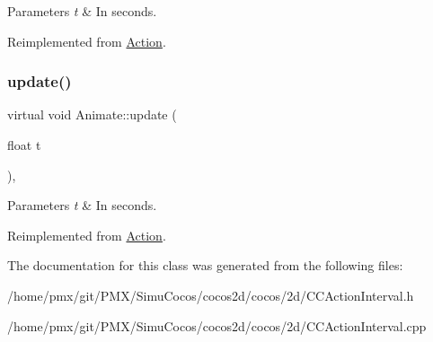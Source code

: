 \begin{DoxyParams}{Parameters}
{\em t} & In seconds. \\
\hline
\end{DoxyParams}


Reimplemented from \hyperlink{classAction_a937e646e63915e33ad05ba149bfcf239}{Action}.

\mbox{\label{classAnimate_a643f933a12b158eb94d1aaa2d8eff13f}} 
\subsubsection{\texorpdfstring{update()}{update()}\hspace{0.1cm}{\footnotesize\ttfamily [2/2]}}
{\footnotesize\ttfamily virtual void Animate\+::update (\begin{DoxyParamCaption}\item[{float}]{t }\end{DoxyParamCaption})\hspace{0.3cm}{\ttfamily [override]}, {\ttfamily [virtual]}}


\begin{DoxyParams}{Parameters}
{\em t} & In seconds. \\
\hline
\end{DoxyParams}


Reimplemented from \hyperlink{classAction_a937e646e63915e33ad05ba149bfcf239}{Action}.



The documentation for this class was generated from the following files\+:\begin{DoxyCompactItemize}
\item 
/home/pmx/git/\+P\+M\+X/\+Simu\+Cocos/cocos2d/cocos/2d/C\+C\+Action\+Interval.\+h\item 
/home/pmx/git/\+P\+M\+X/\+Simu\+Cocos/cocos2d/cocos/2d/C\+C\+Action\+Interval.\+cpp\end{DoxyCompactItemize}
